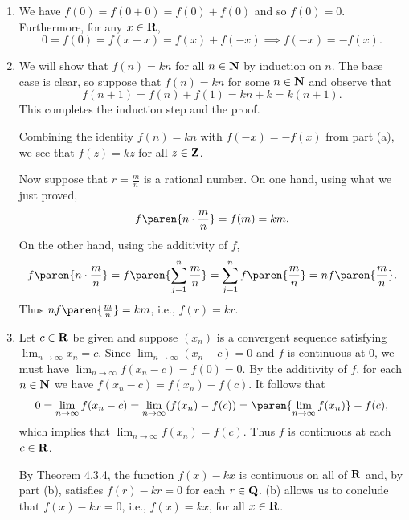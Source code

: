 \documentclass{lew98_solutions}
\begin{document}
\begin{solution}
    \begin{enumerate}
        \item We have \( f(0) = f(0 + 0) = f(0) + f(0) \) and so \( f(0) = 0 \). Furthermore, for any \( x \in \mathbf{R} \),
        \[
            0 = f(0) = f(x - x) = f(x) + f(-x) \implies f(-x) = -f(x).
        \]

        \item We will show that \( f(n) = kn \) for all \( n \in \mathbf{N} \) by induction on \( n \). The base case is clear, so suppose that \( f(n) = kn \) for some \( n \in \mathbf{N} \) and observe that
        \[
            f(n + 1) = f(n) + f(1) = kn + k = k(n + 1).
        \]
        This completes the induction step and the proof.

        Combining the identity \( f(n) = kn \) with \( f(-x) = -f(x) \) from part (a), we see that \( f(z) = kz \) for all \( z \in \mathbf{Z} \).

        Now suppose that \( r = \tfrac{m}{n} \) is a rational number. On one hand, using what we just proved,
        \[
            f \paren{ n \cdot \frac{m}{n} } = f(m) = km.
        \]
        On the other hand, using the additivity of \( f \),
        \[
            f \paren{ n \cdot \frac{m}{n} } = f \paren{ \sum_{j=1}^n \frac{m}{n} } = \sum_{j=1}^n f \paren{ \frac{m}{n} } = n f \paren{ \frac{m}{n} }.
        \]
        Thus \( n f \paren{ \tfrac{m}{n} } = km \), i.e., \( f(r) = kr \).

        \item Let \( c \in \mathbf{R} \) be given and suppose \( (x_n) \) is a convergent sequence satisfying \( \lim_{n \to \infty} x_n = c \). Since \( \lim_{n \to \infty} (x_n - c) = 0 \) and \( f \) is continuous at 0, we must have \( \lim_{n \to \infty} f(x_n - c) = f(0) = 0 \). By the additivity of \( f \), for each \( n \in \mathbf{N} \) we have \( f(x_n - c) = f(x_n) - f(c) \). It follows that
        \[
            0 = \lim_{n \to \infty} f(x_n - c) = \lim_{n \to \infty} (f(x_n) - f(c)) = \paren{ \lim_{n \to \infty} f(x_n) } - f(c),
        \]
        which implies that \( \lim_{n \to \infty} f(x_n) = f(c) \). Thus \( f \) is continuous at each \( c \in \mathbf{R} \).

        By Theorem 4.3.4, the function \( f(x) - kx \) is continuous on all of \( \mathbf{R} \) and, by part (b), satisfies \( f(r) - kr = 0 \) for each \( r \in \mathbf{Q} \).  (b) allows us to conclude that \( f(x) - kx = 0 \), i.e., \( f(x) = kx \), for all \( x \in \mathbf{R} \).
    \end{enumerate}
\end{solution}
\end{document}
